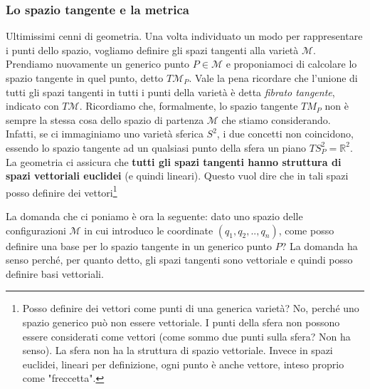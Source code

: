 \documentclass[a4paper,openany]{article}
\begin{document}
	\subsubsection{Lo spazio tangente e la metrica}
	Ultimissimi cenni di geometria. Una volta individuato un modo per rappresentare i punti dello spazio, vogliamo definire gli spazi tangenti alla varietà $\mathcal{M}$. Prendiamo nuovamente un generico punto $P\in\mathcal{M}$ e proponiamoci di calcolare lo spazio tangente in quel punto, detto $T\mathcal{M}_{P}$. Vale la pena ricordare che l'unione di tutti gli spazi tangenti in tutti i punti della varietà è detta \textit{fibrato tangente}, indicato con $T\mathcal{M}$. Ricordiamo che, formalmente, lo spazio tangente $TM_{P}$ non è sempre la stessa cosa dello spazio di partenza $\mathcal{M}$ che stiamo considerando. Infatti, se ci immaginiamo uno varietà sferica $S^2$, i due concetti non coincidono, essendo lo spazio tangente ad un qualsiasi punto della sfera un piano $TS^2_P = \mathbb{R}^2$. La geometria ci assicura che \textbf{tutti gli spazi tangenti hanno struttura di spazi vettoriali euclidei} (e quindi lineari). Questo vuol dire che in tali spazi posso definire dei vettori\footnote{Posso definire dei vettori come punti di una generica varietà? No, perché uno spazio generico può non essere vettoriale. I punti della sfera non possono essere considerati come vettori (come sommo due punti sulla sfera? Non ha senso). La sfera non ha la struttura di spazio vettoriale. Invece in spazi euclidei, lineari per definizione, ogni punto è anche vettore, inteso proprio come "freccetta".}
	
	
	
	La domanda che ci poniamo è ora la seguente: dato uno spazio delle configurazioni $\mathcal{M}$ in cui introduco le coordinate $(q_{1}, q_{2}, .., q_{n})$, come posso definire una base per lo spazio tangente in un generico punto $P$? La domanda ha senso perché, per quanto detto, gli spazi tangenti sono vettoriale e quindi posso definire basi vettoriali.
	
\end{document}
